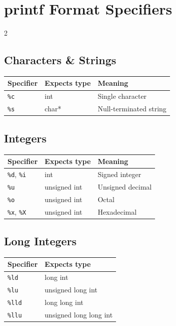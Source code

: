\documentclass[a4paper,9pt]{article}
\begin{document}
    \section{printf Format Specifiers}
    \begin{multicols}{2}
    \subsection*{Characters \& Strings}
    \begin{tabular}{lll}
        \toprule
        Specifier & Expects type & Meaning \\
        \midrule
        \texttt{\%c} & int & Single character \\
        \texttt{\%s} & char* & Null-terminated string \\
        \bottomrule
    \end{tabular}
    
    \subsection*{Integers}
    \begin{tabular}{lll}
        \toprule
        Specifier & Expects type & Meaning \\
        \midrule
        \texttt{\%d}, \texttt{\%i} & int & Signed integer \\
        \texttt{\%u} & unsigned int & Unsigned decimal \\
        \texttt{\%o} & unsigned int & Octal \\
        \texttt{\%x}, \texttt{\%X} & unsigned int & Hexadecimal \\
        \bottomrule
    \end{tabular}
    
    \subsection*{Long Integers}
    \begin{tabular}{ll}
        \toprule
        Specifier & Expects type \\
        \midrule
        \texttt{\%ld} & long int \\
        \texttt{\%lu} & unsigned long int \\
        \texttt{\%lld} & long long int \\
        \texttt{\%llu} & unsigned long long int \\
        \bottomrule
    \end{tabular}
    

\end{multicols}
\end{document}
